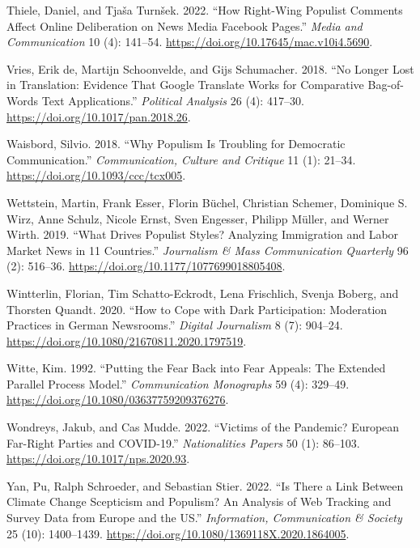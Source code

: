 \documentclass[
]{ccr}
\newlength{\cslhangindent}
\newlength{\cslentryspacingunit} %
\newenvironment{CSLReferences}[2] %
 {%
  \setlength{\parindent}{0pt}
  \ifodd #1
  \let\oldpar\par
  \def\par{\hangindent=\cslhangindent\oldpar}
  \fi
  \setlength{\parskip}{#2\cslentryspacingunit}
 }%
 {}
\begin{document}
\begin{CSLReferences}{1}{0}
\leavevmode{}%
Thiele, Daniel, and Tjaša Turnšek. 2022. {``How {Right-Wing Populist
Comments Affect Online Deliberation} on {News Media Facebook Pages}.''}
\emph{Media and Communication} 10 (4): 141--54.
\url{https://doi.org/10.17645/mac.v10i4.5690}.

\leavevmode{}%
Vries, Erik de, Martijn Schoonvelde, and Gijs Schumacher. 2018. {``No
{Longer Lost} in {Translation}: {Evidence} That {Google Translate Works}
for {Comparative Bag-of-Words Text Applications}.''} \emph{Political
Analysis} 26 (4): 417--30. \url{https://doi.org/10.1017/pan.2018.26}.

\leavevmode{}%
Waisbord, Silvio. 2018. {``Why Populism Is Troubling for Democratic
Communication.''} \emph{Communication, Culture and Critique} 11 (1):
21--34. \url{https://doi.org/10.1093/ccc/tcx005}.

\leavevmode{}%
Wettstein, Martin, Frank Esser, Florin Büchel, Christian Schemer,
Dominique S. Wirz, Anne Schulz, Nicole Ernst, Sven Engesser, Philipp
Müller, and Werner Wirth. 2019. {``What {Drives Populist Styles}?
{Analyzing Immigration} and {Labor Market News} in 11 {Countries}.''}
\emph{Journalism \& Mass Communication Quarterly} 96 (2): 516--36.
\url{https://doi.org/10.1177/1077699018805408}.

\leavevmode{}%
Wintterlin, Florian, Tim Schatto-Eckrodt, Lena Frischlich, Svenja
Boberg, and Thorsten Quandt. 2020. {``How to {Cope} with {Dark
Participation}: {Moderation Practices} in {German Newsrooms}.''}
\emph{Digital Journalism} 8 (7): 904--24.
\url{https://doi.org/10.1080/21670811.2020.1797519}.

\leavevmode{}%
Witte, Kim. 1992. {``Putting the Fear Back into Fear Appeals: {The}
Extended Parallel Process Model.''} \emph{Communication Monographs} 59
(4): 329--49. \url{https://doi.org/10.1080/03637759209376276}.

\leavevmode{}%
Wondreys, Jakub, and Cas Mudde. 2022. {``Victims of the {Pandemic}?
{European Far-Right Parties} and {COVID-19}.''} \emph{Nationalities
Papers} 50 (1): 86--103. \url{https://doi.org/10.1017/nps.2020.93}.

\leavevmode{}%
Yan, Pu, Ralph Schroeder, and Sebastian Stier. 2022. {``Is There a Link
Between Climate Change Scepticism and Populism? {An} Analysis of Web
Tracking and Survey Data from {Europe} and the {US}.''}
\emph{Information, Communication \& Society} 25 (10): 1400--1439.
\url{https://doi.org/10.1080/1369118X.2020.1864005}.

\end{CSLReferences}
\end{document}
